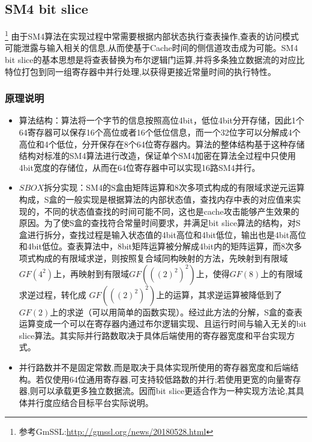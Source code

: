 \subsection{SM4 bit slice}
\footnote{参考GmSSL:\url{http://gmssl.org/news/20180528.html}}
由于SM4算法在实现过程中常需要根据内部状态执行查表操作,查表的访问模式可能泄露与输入相关的信息,从而使基于Cache时间的侧信道攻击成为可能。SM4 bit slice的基本思想是将查表替换为布尔逻辑门运算,并将多条独立数据流的对应比特位打包到同一组寄存器中并行处理,以获得更接近常量时间的执行特性。
\subsubsection{原理说明}
\begin{itemize}
    \item 算法结构：算法将一个字节的信息按照高位4bit，低位4bit分开存储，因此1个64寄存器可以保存16个高位或者16个低位信息，而一个32位字可以分解成4个高位和4个低位，分开保存在8个64位寄存器内。算法的整体结构基于这种存储结构对标准的SM4算法进行改造，保证单个SM4加密在算法全过程中只使用4bit宽度的存储位，从而在64位寄存器中可以实现16路SM4并行。
    \item $SBOX$拆分实现：SM4的S盒由矩阵运算和8次多项式构成的有限域求逆元运算构成，S盒的一般实现是根据算法的内部状态值，查找内存中表的对应值来实现的，不同的状态值查找的时间可能不同，这也是cache攻击能够产生效果的原因。为了使S盒的查找符合常量时间要求，并满足bit slice算法的结构，对S盒进行拆分，查找过程是输入状态值的4bit高位和4bit低位，输出也是4bit高位和4bit低位。查表算法中，8bit矩阵运算被分解成4bit内的矩阵运算，而8次多项式构成的有限域求逆，则按照复合域同构映射的方法，先映射到有限域
$GF(4^2)$上，再映射到有限域$GF(((2)^2)^2)$上，使得$GF(8)$上的有限域求逆过程，转化成
$GF(((2)^2)^2)$上的运算，其求逆运算被降低到了$GF(2)$上的求逆（可以用简单的函数实现）。经过此方法的分解，S盒的查表运算变成一个可以在寄存器内通过布尔逻辑实现、且运行时间与输入无关的bit slice算法。其实际并行路数取决于具体后端使用的寄存器宽度和平台实现方式。
    \item 并行路数并不是固定常数,而是取决于具体实现所使用的寄存器宽度和后端结构。若仅使用64位通用寄存器,可支持较低路数的并行;若使用更宽的向量寄存器,则可以承载更多独立数据流。因而bit slice更适合作为一种实现方法论,其具体并行度应结合目标平台实际说明。
\end{itemize}








